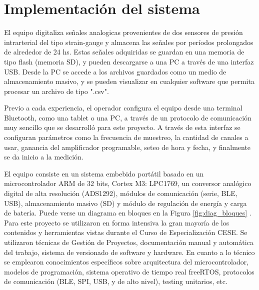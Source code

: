 
\section{Implementación del sistema}

El equipo digitaliza señales analogicas provenientes de dos sensores de presión intrarterial del tipo strain-gauge y almacena las señales por períodos prolongados de alrededor de 24 hs. Estas señales adquiridas se guardan en una memoria de tipo flash (memoria SD), y pueden descargarse a una PC a través de una interfaz USB. Desde la PC se accede a los archivos guardados como un medio de almacenamiento masivo, y se pueden visualizar en cualquier software que permita procesar un archivo de tipo ".csv".

Previo a cada experiencia, el operador configura el equipo desde una terminal Bluetooth, como una tablet o una PC, a través de un protocolo de comunicación muy sencillo que se desarrolló para este proyecto. A través de esta interfaz se configuran parámetros como la frecuencia de muestreo, la cantidad de canales a usar, ganancia del amplificador programable, seteo de hora y fecha, y finalmente se da inicio a la medición. 

El equipo consiste en un sistema embebido portátil basado en un microcontrolador ARM de 32 bits, Cortex M3: LPC1769, un conversor analógico digital de alta resolución (ADS1292), módulos de comunicación (serie, BLE, USB), almacenamiento masivo (SD) y módulo de regulación de energía y carga de batería. Puede verse un diagrama en bloques en la Figura \ref{fig:diag_bloques} . Para este proyecto se utilizaron en forma intensiva la gran mayoría de los contenidos y herramientas vistas durante el Curso de Especialización CESE. Se utilizaron técnicas de Gestión de Proyectos, documentación manual y automática del trabajo, sistema de versionado de software y hardware. En cuanto a lo técnico se emplearon conocimientos específicos sobre arquitectura del microcontrolador, modelos de programación, sistema operativo de tiempo real freeRTOS, protocolos de comunicación (BLE, SPI, USB, y de alto nivel), testing unitarios, etc.


